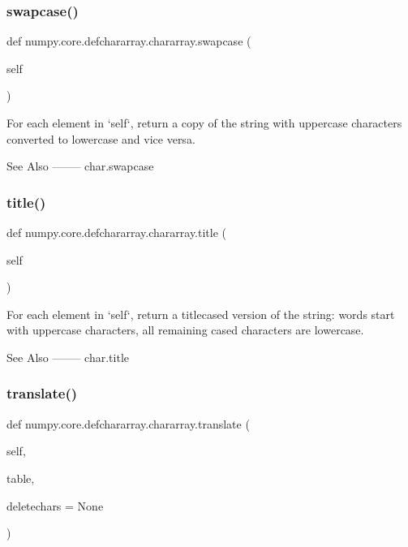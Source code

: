 \subsubsection{\texorpdfstring{swapcase()}{swapcase()}}
{\footnotesize\ttfamily def numpy.\+core.\+defchararray.\+chararray.\+swapcase (\begin{DoxyParamCaption}\item[{}]{self }\end{DoxyParamCaption})}

\begin{DoxyVerb}For each element in `self`, return a copy of the string with
uppercase characters converted to lowercase and vice versa.

See Also
--------
char.swapcase\end{DoxyVerb}
 \mbox{\label{classnumpy_1_1core_1_1defchararray_1_1chararray_ac980c64255b28f6529ce4d3002975ef8}} 
\subsubsection{\texorpdfstring{title()}{title()}}
{\footnotesize\ttfamily def numpy.\+core.\+defchararray.\+chararray.\+title (\begin{DoxyParamCaption}\item[{}]{self }\end{DoxyParamCaption})}

\begin{DoxyVerb}For each element in `self`, return a titlecased version of the
string: words start with uppercase characters, all remaining cased
characters are lowercase.

See Also
--------
char.title\end{DoxyVerb}
 \mbox{\label{classnumpy_1_1core_1_1defchararray_1_1chararray_a58f77ef065a78d275b808c860d38f76d}} 
\subsubsection{\texorpdfstring{translate()}{translate()}}
{\footnotesize\ttfamily def numpy.\+core.\+defchararray.\+chararray.\+translate (\begin{DoxyParamCaption}\item[{}]{self,  }\item[{}]{table,  }\item[{}]{deletechars = {\ttfamily None} }\end{DoxyParamCaption})}

